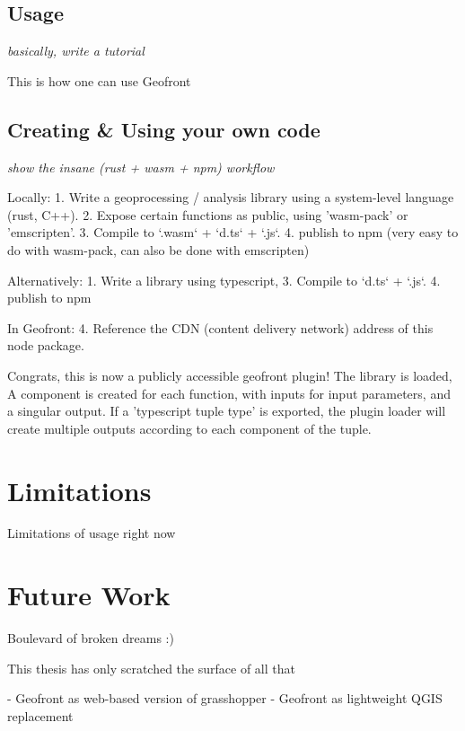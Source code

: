 \subsection{Usage}%

\emph{basically, write a tutorial}

This is how one can use Geofront

\subsection{Creating \& Using your own code}
\emph{show the insane (rust + wasm + npm) workflow}

Locally: 
1. Write a geoprocessing / analysis library using a system-level language (rust, C++).
2. Expose certain functions as public, using 'wasm-pack' or 'emscripten'.
3. Compile to `.wasm` + `d.ts` + `.js`.
4. publish to npm (very easy to do with wasm-pack, can also be done with emscripten)

Alternatively: 
1. Write a library using typescript, 
3. Compile to `d.ts` + `.js`.
4. publish to npm 

In Geofront: 
4. Reference the CDN (content delivery network) address of this node package. 

Congrats, this is now a publicly accessible geofront plugin!
The library is loaded, A component is created for each function, with inputs for input parameters, and a singular output. If a 'typescript tuple type' is exported, the plugin loader will create multiple outputs according to each component of the tuple.

\section{Limitations}%

Limitations of usage right now



\section{Future Work}
Boulevard of broken dreams :) 

This thesis has only scratched the surface of all that

- Geofront as web-based version of grasshopper
- Geofront as lightweight QGIS replacement 

